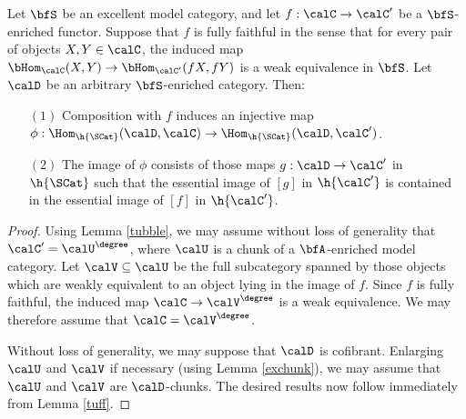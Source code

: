 \begin{Simplicial Categories}
\begin{corollary}\label{suff}
Let $\bfS$ be an excellent model category, and let $f: \calC \rightarrow \calC'$ be a $\bfS$-enriched functor. Suppose that $f$ is fully faithful in the sense that for every pair of objects
$X,Y \in \calC$, the induced map $\bHom_{\calC}( X,Y) \rightarrow \bHom_{\calC'}(fX, fY)$ is a
weak equivalence in $\bfS$. Let $\calD$ be an arbitrary $\bfS$-enriched category. Then:
\begin{itemize}
\item[$(1)$] Composition with $f$ induces an injective map
$\phi: \Hom_{ \h{\SCat}} ( \calD, \calC) \rightarrow \Hom_{ \h{\SCat}}( \calD, \calC' )$.
\item[$(2)$] The image of $\phi$ consists of those maps
$g: \calD \rightarrow \calC'$ in $\h{\SCat}$ such that the essential image of
$[g]$ in $\h{\calC'}$ is contained in the essential image of $[f]$ in $\h{\calC'}$. 
\end{itemize}
\end{corollary}

\begin{proof}
Using Lemma \ref{tubble}, we may assume without loss of generality that
$\calC' = \calU^{\degree}$, where $\calU$ is a chunk of a $\bfA$-enriched model category.
Let $\calV \subseteq \calU$ be the full subcategory spanned by those objects which
are weakly equivalent to an object lying in the image of $f$. Since $f$ is fully faithful,
the induced map $\calC \rightarrow \calV^{\degree}$ is a weak equivalence. We may therefore
assume that $\calC = \calV^{\degree}$. 

Without loss of generality, we may suppose that $\calD$ is cofibrant. 
Enlarging $\calU$ and $\calV$ if necessary (using Lemma \ref{exchunk}), we may assume
that $\calU$ and $\calV$ are $\calD$-chunks. 
The desired results now follow immediately from Lemma \ref{tuff}.
\end{proof} 



\end{Simplicial Categories}
